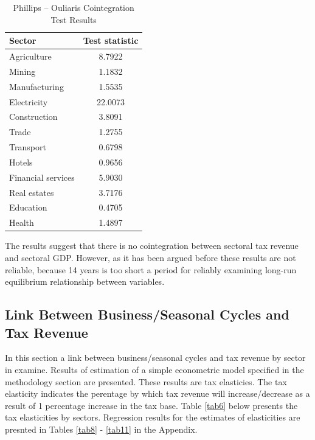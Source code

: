 \documentclass[12pt,a4paper,final]{article}
\begin{document}
\begin{table}[h]
\centering
\begin{small} 
\caption{Phillips -- Ouliaris Cointegration Test Results} 
\label{tabcoint}
\begin{tabular}{l c}
\toprule
\multicolumn{1}{l}{\textbf{Sector}} & \textbf{Test statistic}\\ 
 \midrule
Agriculture & 8.7922 \\
Mining & 1.1832 \\
Manufacturing & 1.5535\\
Electricity  & 22.0073\\
Construction & 3.8091 \\
Trade & 1.2755\\
Transport & 0.6798\\
Hotels & 0.9656\\
Financial services & 5.9030\\
Real estates & 3.7176\\
Education & 0.4705\\
Health & 1.4897\\
\bottomrule
\end{tabular}
\end{small}
\end{table}

The results suggest that there is no cointegration between sectoral tax revenue and sectoral GDP.  However, as it has been argued before these results are not reliable, because 14 years is too short a period for reliably examining long-run equilibrium relationship between variables.

\subsection{Link Between Business/Seasonal Cycles and Tax Revenue}
In this section a link between business/seasonal cycles and tax revenue by sector in examine. Results of estimation of a simple econometric model specified in the methodology section are presented. These results are tax elasticies.  The tax elasticity indicates the perentage by which tax revenue will increase/decrease as a result of 1 percentage increase in the tax base.  Table \ref{tab6} below presents the tax elasticities by sectors. Regression results for the estimates of elasticities are presnted in Tables \ref{tab8} - \ref{tab11} in the Appendix.
\end{document}
